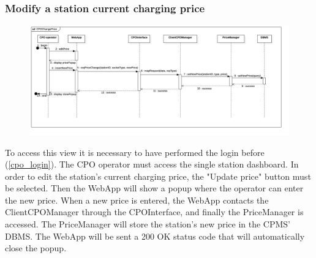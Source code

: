 \subsubsection{Modify a station current charging price}
\begin{figure}[H]
    \begin{center}
        \includegraphics[width=\textwidth]{img/runtime/cpo_price}
    \end{center}
\end{figure}
To access this view it is necessary to have performed the login before (\ref{cpo_login}). The CPO operator must access the single station dashboard. In order to edit the station's current charging price, the "Update price" button must be selected. Then the WebApp will show a popup where the operator can enter the new price.
When a new price is entered, the WebApp contacts the ClientCPOManager through the CPOInterface, and finally the PriceManager is accessed. The PriceManager will store the station's new price in the CPMS' DBMS. The WebApp will be sent a 200 OK status code that will automatically close the popup.
